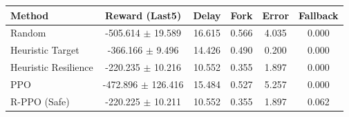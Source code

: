 \small
\setlength{\tabcolsep}{5pt}
\begin{tabular}{lccccc}
\toprule
Method & Reward (Last5) & Delay & Fork & Error & Fallback \\
\midrule
Random & -505.614 $\pm$ 19.589 & 16.615 & 0.566 & 4.035 & 0.000 \\
Heuristic Target & -366.166 $\pm$ 9.496 & 14.426 & 0.490 & 0.200 & 0.000 \\
Heuristic Resilience & -220.235 $\pm$ 10.216 & 10.552 & 0.355 & 1.897 & 0.000 \\
PPO & -472.896 $\pm$ 126.416 & 15.484 & 0.527 & 5.257 & 0.000 \\
R-PPO (Safe) & -220.225 $\pm$ 10.211 & 10.552 & 0.355 & 1.897 & 0.062 \\
\bottomrule
\end{tabular}
